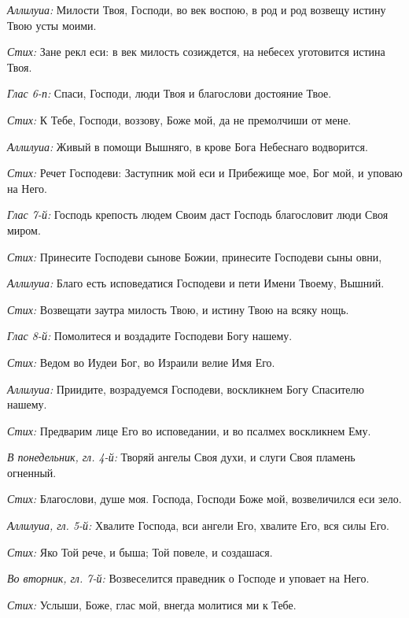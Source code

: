 \begin{mymulticols}
{\itshape Аллилуиа:} Милости Твоя, Господи, во век воспою, в род и род возвещу истину Твою усты моими.


{\itshape Стих:} Зане рекл еси: в век милость созиждется, на небесех уготовится истина Твоя.


{\itshape Глас 6-п:} Спаси, Господи, люди Твоя и благослови достояние Твое.


{\itshape Стих:} К Тебе, Господи, воззову, Боже мой, да не премолчиши от мене.


{\itshape Аллилуиа:} Живый в помощи Вышняго, в крове Бога Небеснаго водворится.


{\itshape Стих:} Речет Господеви: Заступник мой еси и Прибежище мое, Бог мой, и уповаю на Него.


{\itshape Глас 7-й:} Господь крепость людем Своим даст Господь благословит люди Своя миром.


{\itshape Стих:} Принесите Господеви сынове Божии, принесите Господеви сыны овни,


{\itshape Аллилуиа:} Благо есть исповедатися Господеви и пети Имени Твоему, Вышний.


{\itshape Стих:} Возвещати заутра милость Твою, и истину Твою на всяку нощь.


{\itshape Глас 8-й:} Помолитеся и воздадите Господеви Богу нашему.


{\itshape Стих:} Ведом во Иудеи Бог, во Израили велие Имя Его.


{\itshape Аллилуиа:} Приидите, возрадуемся Господеви, воскликнем Богу Спасителю нашему.


{\itshape Стих:} Предварим лице Его во исповедании, и во псалмех воскликнем Ему.






{\itshape В понедельник, гл. 4-й:} Творяй ангелы Своя духи, и слуги Своя пламень огненный.


{\itshape Стих:} Благослови, душе моя. Господа, Господи Боже мой, возвеличился еси зело.


{\itshape Аллилуиа, гл. 5-й:} Хвалите Господа, вси ангели Его, хвалите Его, вся силы Его.


{\itshape Стих:} Яко Той рече, и быша; Той повеле, и создашася.


{\itshape Во вторник, гл. 7-й:} Возвеселится праведник о Господе и уповает на Него.


{\itshape Стих:} Услыши, Боже, глас мой, внегда молитися ми к Тебе.



\end{mymulticols}
